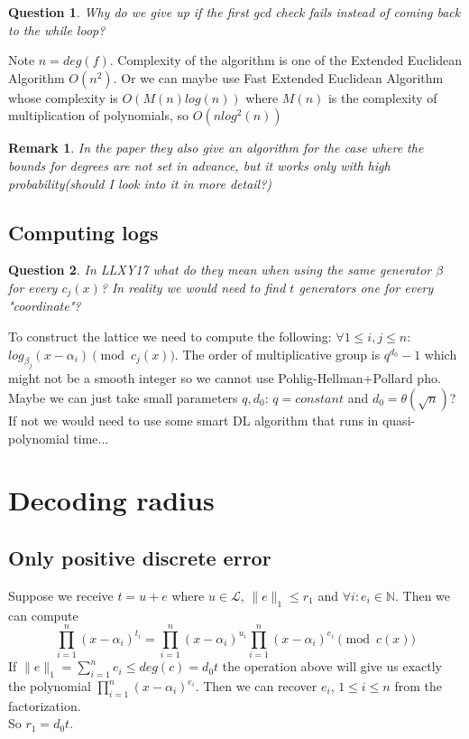 \documentclass[12pt]{article}
\newtheorem{question}{Question}
\newtheorem{remark}{Remark}
\begin{document}
\begin{question}
Why do we give up if the first gcd check fails instead of coming back to the while loop?
\end{question}
Note $n = deg(f)$.
Complexity of the algorithm is one of the Extended Euclidean Algorithm $O(n^2)$. Or we can maybe use Fast Extended Euclidean Algorithm whose complexity is $O(M(n)log(n))$ where $M(n)$ is the complexity of multiplication of polynomials, so $O(nlog^2(n))$
\begin{remark}
In the paper they also give an algorithm for the case where the bounds for degrees are not set in advance, but it works only with high probability(should I look into it in more detail?)
\end{remark}
\subsection{Computing logs}
\begin{question}
In LLXY17 what do they mean when using the same generator $\beta$ for every $c_j(x)$? In reality we would need to find $t$ generators one for every "coordinate"?
\end{question}
To construct the lattice we need to compute the following:
$\forall 1 \leq i,j \leq n :$ $log_{\beta_j}(x - \alpha_i) \pmod{c_j(x)}$. The order of multiplicative group is $q^{d_0} - 1$ which might not be a smooth integer so we cannot use Pohlig-Hellman+Pollard pho. Maybe we can just take small parameters $q, d_0$: $q=constant$ and $d_0 = \theta(\sqrt n)$? If not we would need to use some smart DL algorithm that runs in quasi-polynomial time...

\section{Decoding radius}

\subsection{Only positive discrete error}
Suppose we receive $t = u + e$ where $u \in \mathcal{L}$, $\|e\|_1 \leq r_1$ and $\forall i: e_i \in \mathbb{N}$. Then we can compute 
\begin{equation}
\prod_{i = 1}^{n}(x - \alpha_i)^{t_i} = \prod_{i = 1}^{n}(x - \alpha_i)^{u_i}\prod_{i = 1}^{n}(x - \alpha_i)^{e_i} \pmod{c(x)}
\end{equation}
If $\|e\|_1 = \sum_{i =1}^{n} e_i \leq deg(c) = d_0t$ the operation above will give us exactly the polynomial $\prod_{i = 1}^{n}(x - \alpha_i)^{e_i}$. Then we can recover $e_i$, $1 \leq i \leq n$ from the factorization.\\
So $r_1 = d_0t$.
\end{document}
